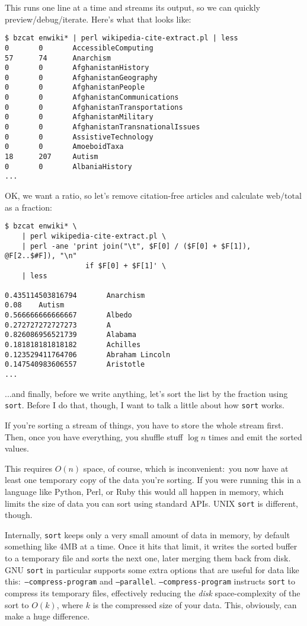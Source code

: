 This runs one line at a time and streams its output, so we can quickly
preview/debug/iterate. Here's what that looks like:

\begin{verbatim}
$ bzcat enwiki* | perl wikipedia-cite-extract.pl | less
0       0       AccessibleComputing
57      74      Anarchism
0       0       AfghanistanHistory
0       0       AfghanistanGeography
0       0       AfghanistanPeople
0       0       AfghanistanCommunications
0       0       AfghanistanTransportations
0       0       AfghanistanMilitary
0       0       AfghanistanTransnationalIssues
0       0       AssistiveTechnology
0       0       AmoeboidTaxa
18      207     Autism
0       0       AlbaniaHistory
...\end{verbatim}

OK, we want a ratio, so let's remove citation-free articles and calculate
$\textrm{web}/\textrm{total}$ as a fraction:

\begin{verbatim}
$ bzcat enwiki* \
    | perl wikipedia-cite-extract.pl \
    | perl -ane 'print join("\t", $F[0] / ($F[0] + $F[1]), @F[2..$#F]), "\n"
                   if $F[0] + $F[1]' \
    | less

0.435114503816794       Anarchism
0.08    Autism
0.566666666666667       Albedo
0.272727272727273       A
0.826086956521739       Alabama
0.181818181818182       Achilles
0.123529411764706       Abraham Lincoln
0.147540983606557       Aristotle
...\end{verbatim}

...and finally, before we write anything, let's sort the list by the fraction
using {\tt sort}. Before I do that, though, I want to talk a little about how
{\tt sort} works.

If you're sorting a stream of things, you have to store the whole stream first.
Then, once you have everything, you shuffle stuff $\log n$ times and emit the
sorted values.

This requires $O(n)$ space, of course, which is inconvenient:~you now have at
least one temporary copy of the data you're sorting. If you were running this in
a language like Python, Perl, or Ruby this would all happen in memory, which
limits the size of data you can sort using standard APIs. UNIX {\tt sort} is
different, though.

Internally, {\tt sort} keeps only a very small amount of data in memory, by
default something like 4MB at a time. Once it hits that limit, it writes the
sorted buffer to a temporary file and sorts the next one, later merging them
back from disk. GNU {\tt sort} in particular supports some extra options that
are useful for data like this:~{\tt --compress-program} and {\tt --parallel}.
{\tt --compress-program} instructs {\tt sort} to compress its temporary files,
effectively reducing the {\it disk} space-complexity of the sort to $O(k)$,
where $k$ is the compressed size of your data. This, obviously, can make a huge
difference.

